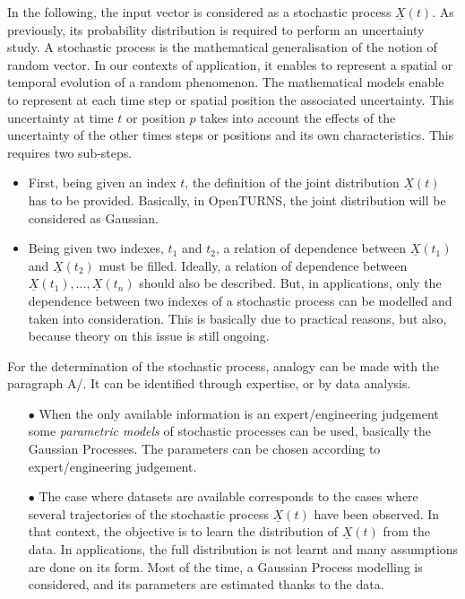 In the following, the input vector is considered as a stochastic process $\underline{X}(t)$. As previously, its probability distribution is required to perform an uncertainty study.
A stochastic process is the mathematical generalisation of the notion of random vector. In our contexts of application, it enables to represent a spatial or temporal evolution of a random phenomenon. The mathematical models enable to represent at each time step or spatial position the associated uncertainty. This uncertainty at time $t$ or position $p$ takes into account the effects of the uncertainty of the other times steps or positions and its own characteristics. This requires two sub-steps.
\begin{itemize}
\item First, being given an index $t$, the definition of the joint distribution $\underline{X}(t)$ has to be provided. Basically, in OpenTURNS, the joint distribution will be considered as Gaussian.
\item Being given two indexes, $t_1$ and $t_2$, a relation of dependence between $\underline{X}(t_1)$ and $\underline{X}(t_2)$ must be filled. Ideally, a relation of dependence between $\underline{X}(t_1),\ldots,\underline{X}(t_n)$ should also be described. But, in applications, only the dependence between two indexes of a stochastic process can be modelled and taken into consideration. This is basically due to practical reasons, but also, because theory on this issue is still ongoing.
\end{itemize}

For the determination of the stochastic process, analogy can be made with the paragraph A/. It can be identified through expertise, or by data analysis.
\begin{itemize}
\item[$\bullet$] When the only available information is an expert/engineering judgement some {\em parametric models} of stochastic processes can be used, basically the Gaussian Processes.    The parameters can be chosen according to expert/engineering judgement.
\item[$\bullet$] The case where datasets are available corresponds to the cases where several trajectories of the stochastic process $\underline{X}(t)$ have been observed.
  In that context, the objective is to learn the distribution of $\underline{X}(t)$ from the data. In applications, the full distribution is not learnt and many assumptions are done on its form.
  Most of the time, a Gaussian Process modelling is considered, and its parameters are estimated thanks to the data.
\end{itemize}


